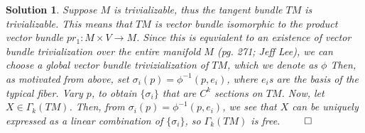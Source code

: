 \documentclass{article} %
\theoremstyle{quest}
\newtheorem*{solution}{Solution}
\begin{document}
\begin{solution}
\bigskip



Suppose $M$ is trivializable, thus the tangent bundle $TM$ is trivializable.
This means that $TM$ is vector bundle isomorphic to the product vector bundle 
$pr_1: M \times V \to M$. Since this is equvialent to an existence of vector bundle 
trivialization over the entire manifold $M$ (pg. 271; Jeff Lee), 
we can choose a global vector bundle trivizialization of $TM$, which we denote as $\phi$
Then, as motivated from above, set $\sigma_i(p) = \phi^{-1}(p,e_i)$, where $e_i$s
are the basis of the typical fiber. Vary $p$, to obtain $\{\sigma_i\}$ 
that are $C^k$ sections on $TM$. Now, let $X \in \Gamma_k(TM)$. Then, 
from $\sigma_i(p) = \phi^{-1}(p,e_i)$, we see that $X$ can be uniquely expressed
as a linear combination of $\{\sigma_i\}$, so $\Gamma_k(TM)$ is free. \hfill
$\qed$    
 

\end{solution}
\end{document}
